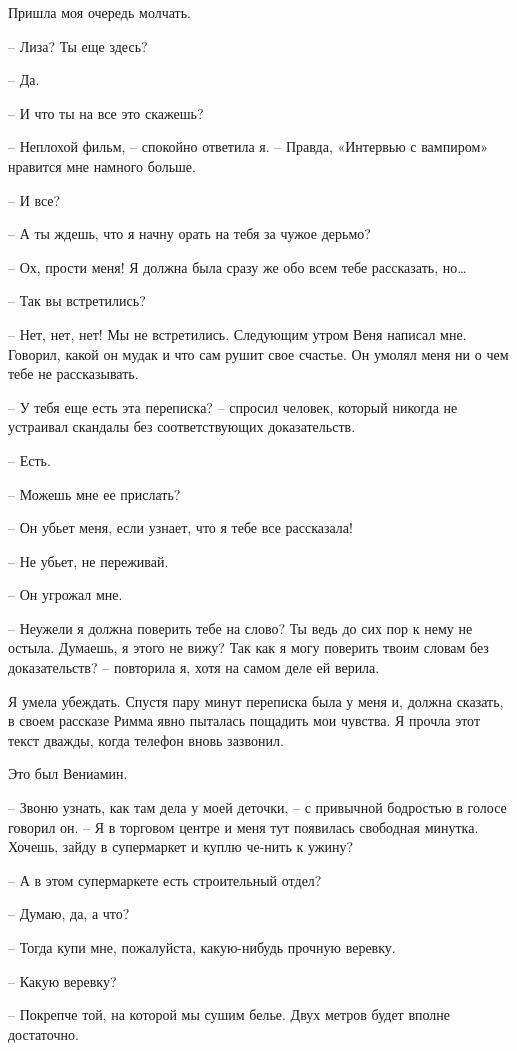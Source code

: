 \documentclass[
]{book}
\begin{document}
Пришла моя очередь молчать.

-- Лиза? Ты еще здесь?

-- Да.

-- И что ты на все это скажешь?

-- Неплохой фильм, -- спокойно ответила я. -- Правда, «Интервью с вампиром» нравится мне намного больше.

-- И все?

-- А ты ждешь, что я начну орать на тебя за чужое дерьмо?

-- Ох, прости меня! Я должна была сразу же обо всем тебе рассказать, но\ldots{}

-- Так вы встретились?

-- Нет, нет, нет! Мы не встретились. Следующим утром Веня написал мне. Говорил, какой он мудак и что сам рушит свое счастье. Он умолял меня ни о чем тебе не рассказывать.

-- У тебя еще есть эта переписка? -- спросил человек, который никогда не устраивал скандалы без соответствующих доказательств.

-- Есть.

-- Можешь мне ее прислать?

-- Он убьет меня, если узнает, что я тебе все рассказала!

-- Не убьет, не переживай.

-- Он угрожал мне.

-- Неужели я должна поверить тебе на слово? Ты ведь до сих пор к нему не остыла. Думаешь, я этого не вижу? Так как я могу поверить твоим словам без доказательств? -- повторила я, хотя на самом деле ей верила.

Я умела убеждать. Спустя пару минут переписка была у меня и, должна сказать, в своем рассказе Римма явно пыталась пощадить мои чувства. Я прочла этот текст дважды, когда телефон вновь зазвонил.

Это был Вениамин.

-- Звоню узнать, как там дела у моей деточки, -- с привычной бодростью в голосе говорил он. -- Я в торговом центре и меня тут появилась свободная минутка. Хочешь, зайду в супермаркет и куплю че-нить к ужину?

-- А в этом супермаркете есть строительный отдел?

-- Думаю, да, а что?

-- Тогда купи мне, пожалуйста, какую-нибудь прочную веревку.

-- Какую веревку?

-- Покрепче той, на которой мы сушим белье. Двух метров будет вполне достаточно.
\end{document}

